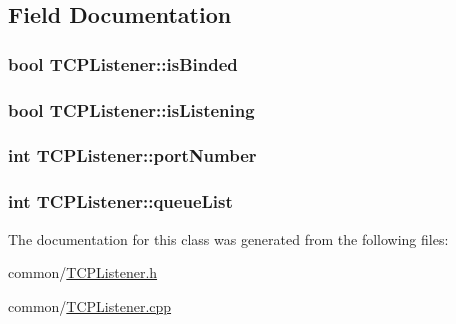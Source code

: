 \subsection{\-Field \-Documentation}
\hypertarget{classTCPListener_ae2a201690fd3e302cf2a04be52617b48}{
\subsubsection[{is\-Binded}]{\setlength{\rightskip}{0pt plus 5cm}bool {\bf \-T\-C\-P\-Listener\-::is\-Binded}}}\label{classTCPListener_ae2a201690fd3e302cf2a04be52617b48}
\hypertarget{classTCPListener_ab7f4c0050982e82238e463186abd683b}{
\subsubsection[{is\-Listening}]{\setlength{\rightskip}{0pt plus 5cm}bool {\bf \-T\-C\-P\-Listener\-::is\-Listening}}}\label{classTCPListener_ab7f4c0050982e82238e463186abd683b}
\hypertarget{classTCPListener_adb28c377cc7edd8011e2171027ad163e}{
\subsubsection[{port\-Number}]{\setlength{\rightskip}{0pt plus 5cm}int {\bf \-T\-C\-P\-Listener\-::port\-Number}}}\label{classTCPListener_adb28c377cc7edd8011e2171027ad163e}
\hypertarget{classTCPListener_ad8dcabf3ed2e479f8c518a5b31a9b143}{
\subsubsection[{queue\-List}]{\setlength{\rightskip}{0pt plus 5cm}int {\bf \-T\-C\-P\-Listener\-::queue\-List}}}\label{classTCPListener_ad8dcabf3ed2e479f8c518a5b31a9b143}


\-The documentation for this class was generated from the following files\-:\begin{DoxyCompactItemize}
\item 
common/\hyperlink{TCPListener_8h}{\-T\-C\-P\-Listener.\-h}\item 
common/\hyperlink{TCPListener_8cpp}{\-T\-C\-P\-Listener.\-cpp}\end{DoxyCompactItemize}
